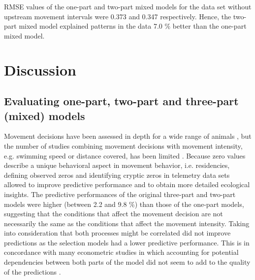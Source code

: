 \documentclass[preprint,12pt,authoryear]{elsarticle}
\begin{document}
RMSE values of the one-part and two-part mixed models for the data set without upstream movement intervals were 0.373 and 0.347 respectively. Hence, the two-part mixed model explained patterns in the data 7.0 \% better than the one-part mixed model.

\FloatBarrier

\section{Discussion}

\subsection{Evaluating one-part, two-part and three-part (mixed) models}

Movement decisions have been assessed in depth for a wide range of animals \citep{Berdahl2017SocialFish,Dechmann2017DeterminantsBat,ONeal2018TheDucks}, but the number of studies combining movement decisions with movement intensity, e.g. swimming speed or distance covered, has been limited \citep{Brodersen2008OptimalFish}. Because zero values describe a unique behavioral aspect in movement behavior, i.e. residencies, defining observed zeros and identifying cryptic zeros in telemetry data sets allowed to improve predictive performance and to obtain more detailed ecological insights. The predictive performances of the original three-part and two-part models were higher (between 2.2 and 9.8 \%) than those of the one-part models, suggesting that the conditions that affect the movement decision are not necessarily the same as the conditions that affect the movement intensity. Taking into consideration that both processes might be correlated did not improve predictions as the selection models had a lower predictive performance. This is in concordance with many econometric studies in which accounting for potential dependencies between both parts of the model did not seem to add to the quality of the predictions \citep{Madden2008SampleDrinking,Smith2003OnModels}. 
\end{document}
